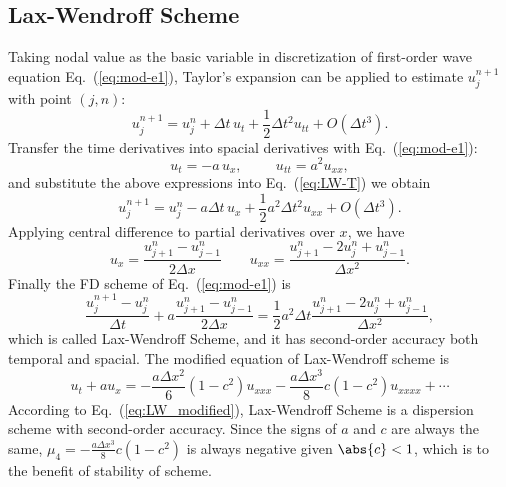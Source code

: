 \documentclass[]{article}
\begin{document}
\subsection{Lax-Wendroff Scheme} \label{sec:lax-wendroff-scheme}

Taking nodal value as the basic variable in discretization of first-order 
wave equation Eq.~(\ref{eq:mod-e1}), Taylor's expansion can be
applied to estimate $u_j^{n+1}$ with point $(j,n)$:
\begin{equation}
  u_j^{n+1}=u_j^n+\Delta t\,u_t +\frac{1}{2}\Delta t^2 u_{tt}+O(\Delta t^3).
  \label{eq:LW-T} 
\end{equation}
Transfer the time derivatives into spacial derivatives with
Eq.~(\ref{eq:mod-e1}):
\begin{equation*}
  u_t=-a\, u_x,\hspace{1cm} u_{tt} = a^2 u_{xx},
\end{equation*}
and substitute the above expressions into Eq.~(\ref{eq:LW-T}) we
obtain
\begin{equation}
  u_j^{n+1}=u_j^n-a\Delta t\, u_x +\frac{1}{2}a^2\Delta t^2 u_{xx}+O(\Delta t^3).
  \label{eq:LW-T1} 
\end{equation}
Applying central difference to partial derivatives over $x$, we have
\begin{equation*}
  u_x=\dfrac{u_{j+1}^n-u_{j-1}^n}{2\Delta x} \qquad
  u_{xx}=\dfrac{u_{j+1}^n-2u_j^n+u_{j-1}^n}{\Delta x^2}.
\end{equation*}
Finally the FD scheme of Eq.~(\ref{eq:mod-e1}) is
\begin{equation*}
  \label{eq:LW} \dfrac{u_{j}^{n+1}-u_{j}^n}{\Delta
    t}+a\dfrac{u_{j+1}^n-u_{j-1}^n}{2\Delta x} =\dfrac{1}{2}a^2\Delta
  t\dfrac{u_{j+1}^n-2u_j^n+u_{j-1}^n}{\Delta x^2},
\end{equation*}
which is called Lax-Wendroff Scheme, and it has second-order accuracy
both temporal and spacial. The modified equation of Lax-Wendroff
scheme is
\begin{equation}
  u_t+au_x=-\frac{a\Delta x^2}{6}(1-c^2)u_{xxx} -\frac{a\Delta x^3}{8}c(1-c^2)u_{xxxx}+\cdots
  \label{eq:LW_modified}
\end{equation}
According to Eq.~(\ref{eq:LW_modified}), Lax-Wendroff Scheme is a
dispersion scheme with second-order accuracy. Since the signs of $a$
and $c$ are always the same, $\mu_4=-\frac{a\Delta x^3}{8}c(1-c^2)$ is
always negative given $\abs{c} < 1$, which is to the benefit of
stability of scheme.
\end{document}
